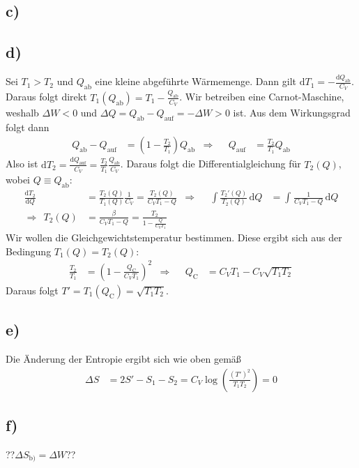 \documentclass[a4paper,12pt]{article}
\newcommand{\intx}{}
\newcommand{\kla}{}
\newcommand{\tecxt}{}
\begin{document}
\subsection*{c)}
\subsection*{d)}Sei $T_1>T_2$ und $Q_\tecxt\text{ab}$ eine kleine abgeführte Wärmemenge. Dann gilt $\tecxt\text{d} T_1=-\frac{\tecxt\text{d} Q_\tecxt\text{ab}}{C_V}$. Daraus folgt direkt $T_1(Q_\tecxt\text{ab})=T_1-\frac{Q_\tecxt\text{ab}}{C_V}$. Wir betreiben eine Carnot-Maschine, weshalb $\Delta W<0$ und $\Delta Q=Q_\tecxt\text{ab}-Q_\tecxt\text{auf}=-\Delta W>0$ ist. Aus dem Wirkungsgrad folgt dann
\begin{align*}
Q_\tecxt\text{ab}-Q_\tecxt\text{auf}&=\kla\left( {1-\frac{T_2}{T_1}} \right)Q_\tecxt\text{ab}&\Rightarrow &&Q_\tecxt\text{auf}&=\frac{T_2}{T_1}Q_\tecxt\text{ab}
\end{align*}
Also ist $\tecxt\text{d} T_2=\frac{\tecxt\text{d} Q_\tecxt\text{auf}}{C_V}=\frac{T_2}{T_1}\frac{Q_\tecxt\text{ab}}{C_V}$. Daraus folgt die Differentialgleichung für $T_2(Q)$, wobei $Q\equiv Q_\tecxt\text{ab}$:
\begin{align*}
\frac{\tecxt\text{d}T_2}{\tecxt\text{d}Q}&=\frac{T_2(Q)}{T_1(Q)}\frac{1}{C_V}=\frac{T_2(Q)}{C_VT_1-Q}&\Rightarrow &&\int\frac{T_2'(Q)}{T_2(Q)}\,\mathrm{d}Q&=\intx\int_{ }^{ }\frac{1}{C_VT_1-Q}\,\mathrm{d}Q\\
\Rightarrow\ \ T_2(Q)&=\frac{\beta}{C_VT_1-Q}=\frac{T_2}{1-\frac{Q}{C_VT_1}}
\end{align*}
Wir wollen die Gleichgewichtstemperatur bestimmen. Diese ergibt sich aus der Bedingung $T_1(Q)=T_2(Q)$:
\begin{align*}
\frac{T_2}{T_1}&=\kla\left( {1-\frac{Q_\tecxt\text{C}}{C_VT_1}} \right)^2&\Rightarrow &&Q_\tecxt\text{C}&=C_VT_1-C_V\sqrt{T_1T_2}
\end{align*}
Daraus folgt $T'=T_1(Q_\tecxt\text{C})=\sqrt{T_1T_2}$.
\subsection*{e)}Die Änderung der Entropie ergibt sich wie oben gemäß
\begin{align*}
\Delta S&=2S'-S_1-S_2=C_V\log\kla\left( {\frac{(T')^2}{T_1T_2}} \right)=0
\end{align*}
\subsection*{f)}??$\Delta S_{\tecxt\text{b})}=\Delta W$??
\end{document}
